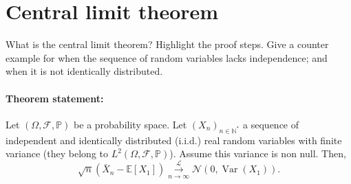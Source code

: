 \section{Central limit theorem}

\begin{tcolorbox}[width=\linewidth, sharp corners=all, colback=white!95!black]
What is the central limit theorem? Highlight the proof steps. Give a counter example for when the sequence of random variables lacks independence; and when it is not identically distributed.
\end{tcolorbox}

\paragraph*{Theorem statement:} Let $(\Omega, \mathcal{F}, \mathbb{P})$ be a probability space. Let $(X_n)_{n\in \mathbb{N}^{*}}$ a sequence of independent and identically distributed (i.i.d.) real random variables with finite variance (they belong to $L^2(\Omega, \mathcal{F}, \mathbb{P})$). Assume this variance is non null. Then, 
\[
\sqrt{n}(\bar{X}_n - \mathbb{E}[X_1]) \stackrel{\mathcal{L}}{\underset{n \to \infty}{\longrightarrow}} \mathcal{N}(0, \operatorname{Var}(X_1)).
\]


